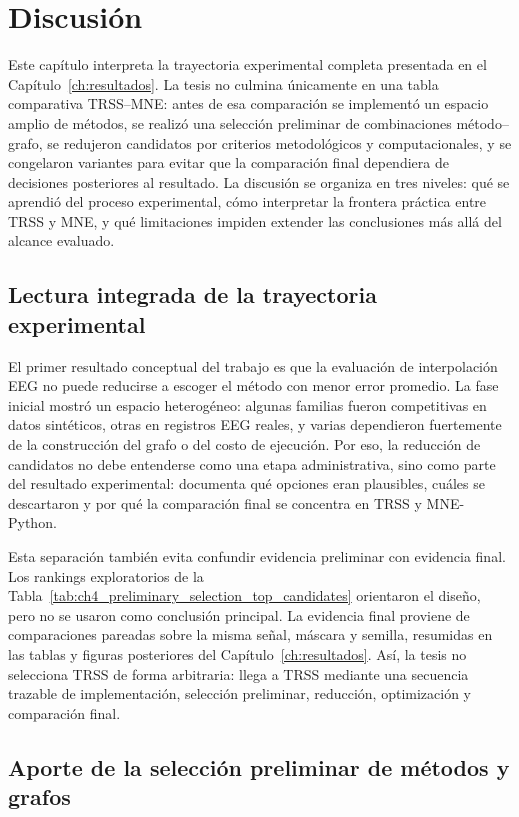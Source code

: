 \chapter{Discusión}
\label{ch:discusion}

Este capítulo interpreta la trayectoria experimental completa presentada en el Capítulo~\ref{ch:resultados}. La tesis no culmina únicamente en una tabla comparativa TRSS--MNE: antes de esa comparación se implementó un espacio amplio de métodos, se realizó una selección preliminar de combinaciones método--grafo, se redujeron candidatos por criterios metodológicos y computacionales, y se congelaron variantes para evitar que la comparación final dependiera de decisiones posteriores al resultado. La discusión se organiza en tres niveles: qué se aprendió del proceso experimental, cómo interpretar la frontera práctica entre TRSS y MNE, y qué limitaciones impiden extender las conclusiones más allá del alcance evaluado.

\section{Lectura integrada de la trayectoria experimental}

El primer resultado conceptual del trabajo es que la evaluación de interpolación EEG no puede reducirse a escoger el método con menor error promedio. La fase inicial mostró un espacio heterogéneo: algunas familias fueron competitivas en datos sintéticos, otras en registros EEG reales, y varias dependieron fuertemente de la construcción del grafo o del costo de ejecución. Por eso, la reducción de candidatos no debe entenderse como una etapa administrativa, sino como parte del resultado experimental: documenta qué opciones eran plausibles, cuáles se descartaron y por qué la comparación final se concentra en TRSS y MNE-Python.

Esta separación también evita confundir evidencia preliminar con evidencia final. Los rankings exploratorios de la Tabla~\ref{tab:ch4_preliminary_selection_top_candidates} orientaron el diseño, pero no se usaron como conclusión principal. La evidencia final proviene de comparaciones pareadas sobre la misma señal, máscara y semilla, resumidas en las tablas y figuras posteriores del Capítulo~\ref{ch:resultados}. Así, la tesis no selecciona TRSS de forma arbitraria: llega a TRSS mediante una secuencia trazable de implementación, selección preliminar, reducción, optimización y comparación final.

\section{Aporte de la selección preliminar de métodos y grafos}

